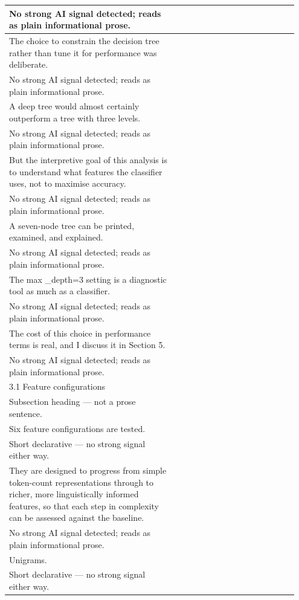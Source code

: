 \documentclass[11pt]{article}
\begin{document}
\begin{longtable}{|p{0.55\linewidth}|p{0.40\linewidth}|}
\hline
No strong AI signal detected; reads as plain informational prose. & \\
\hline
The choice to constrain the decision tree rather than tune it for performance was deliberate. & \\[2pt]
\hline
No strong AI signal detected; reads as plain informational prose. & \\
\hline
A deep tree would almost certainly outperform a tree with three levels. & \\[2pt]
\hline
No strong AI signal detected; reads as plain informational prose. & \\
\hline
But the interpretive goal of this analysis is to understand what features the classifier uses, not to maximise accuracy. & \\[2pt]
\hline
No strong AI signal detected; reads as plain informational prose. & \\
\hline
A seven-node tree can be printed, examined, and explained. & \\[2pt]
\hline
No strong AI signal detected; reads as plain informational prose. & \\
\hline
The max \_depth=3 setting is a diagnostic tool as much as a classifier. & \\[2pt]
\hline
No strong AI signal detected; reads as plain informational prose. & \\
\hline
The cost of this choice in performance terms is real, and I discuss it in Section 5. & \\[2pt]
\hline
No strong AI signal detected; reads as plain informational prose. & \\
\hline
3.1 Feature configurations & \\[2pt]
\hline
Subsection heading --- not a prose sentence. & \\
\hline
Six feature configurations are tested. & \\[2pt]
\hline
Short declarative --- no strong signal either way. & \\
\hline
They are designed to progress from simple token-count representations through to richer, more linguistically informed features, so that each step in complexity can be assessed against the baseline. & \\[2pt]
\hline
No strong AI signal detected; reads as plain informational prose. & \\
\hline
Unigrams. & \\[2pt]
\hline
Short declarative --- no strong signal either way. & \\
\hline

\end{longtable}
\end{document}
